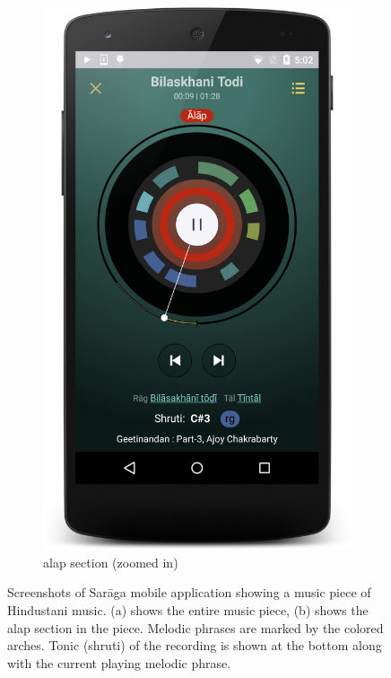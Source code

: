 \begin{figure}
\begin{subfigure}[b]{0.48\textwidth}
		\includegraphics[width=\figSizeNinety]{ch08_applications/figures/saraga2.png}
		\caption{\Gls{alap} section (zoomed in)}
		\label{fig:saraga_alap_section}
	\end{subfigure}
	\caption[Screenshots of Sar\={a}ga mobile application]{Screenshots of Sar\={a}ga mobile application showing a music piece of Hindustani music. (a) shows the entire music piece, (b) shows the \gls{alap} section in the piece. Melodic phrases are marked by the colored arches. Tonic (\gls{shruti}) of the recording is shown at the bottom along with the current playing melodic phrase.}
	\label{fig:saraga_screens}
\end{figure}


